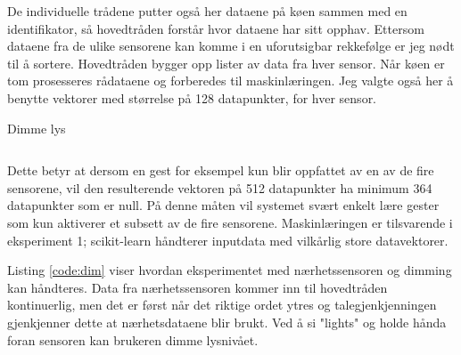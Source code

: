 De individuelle trådene putter også her dataene på køen sammen med en identifikator, så hovedtråden forstår hvor dataene har sitt opphav. Ettersom dataene fra de ulike sensorene kan komme i en uforutsigbar rekkefølge er jeg nødt til å sortere. Hovedtråden bygger opp lister av data fra hver sensor. Når køen er tom prosesseres rådataene og forberedes til maskinlæringen. Jeg valgte også her å benytte vektorer med størrelse på 128 datapunkter, for hver sensor. \begin{listing}[ht]
\caption{Dimme lys}
\inputminted[fontsize=\footnotesize, linenos]{python}{kodesnutter/dimming.py}
\label{code:dim}
\end{listing}Dette betyr at dersom en gest for eksempel kun blir oppfattet av en av de fire sensorene, vil den resulterende vektoren på 512 datapunkter ha minimum 364 datapunkter som er null. På denne måten vil systemet svært enkelt lære gester som kun aktiverer et subsett av de fire sensorene. Maskinlæringen er tilsvarende i eksperiment 1; scikit-learn håndterer inputdata med vilkårlig store datavektorer.

Listing \ref{code:dim} viser hvordan eksperimentet med nærhetssensoren og dimming kan håndteres. Data fra nærhetssensoren kommer inn til hovedtråden kontinuerlig, men det er først når det riktige ordet ytres og talegjenkjenningen gjenkjenner dette at nærhetsdataene blir brukt. Ved å si "lights" og holde hånda foran sensoren kan brukeren dimme lysnivået.

